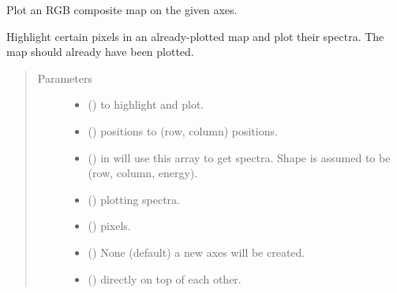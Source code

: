 \documentclass[letterpaper,10pt,english]{sphinxmanual}
\begin{document}
\begin{fulllineitems}
\label{\detokenize{xanespy:xanespy.plots.plot_composite_map}}
Plot an RGB composite map on the given axes.

\end{fulllineitems}


\begin{fulllineitems}
\label{\detokenize{xanespy:xanespy.plots.plot_pixel_spectra}}
Highlight certain pixels in an already-plotted map and plot their
spectra. The map should already have been plotted.
\begin{quote}\begin{description}
\item[{Parameters}] \leavevmode\begin{itemize}
\item {} 
 (\sphinxstyleliteralemphasis{-}) \textendash{} to highlight and plot.

\item {} 
 (\sphinxstyleliteralemphasis{-}) \textendash{} positions to (row, column) positions.

\item {} 
 (\sphinxstyleliteralemphasis{-}) \textendash{} in  will use this array to get spectra. Shape is assumed
to be (row, column, energy).

\item {} 
 (\sphinxstyleliteralemphasis{-}) \textendash{} plotting spectra.

\item {} 
 (\sphinxstyleliteralemphasis{-}) \textendash{} pixels.

\item {} 
 (\sphinxstyleliteralemphasis{-}) \textendash{} None (default) a new axes will be created.

\item {} 
 (\sphinxstyleliteralemphasis{-}) \textendash{} directly on top of each other.

\end{itemize}

\end{description}\end{quote}

\end{fulllineitems}
\end{document}
